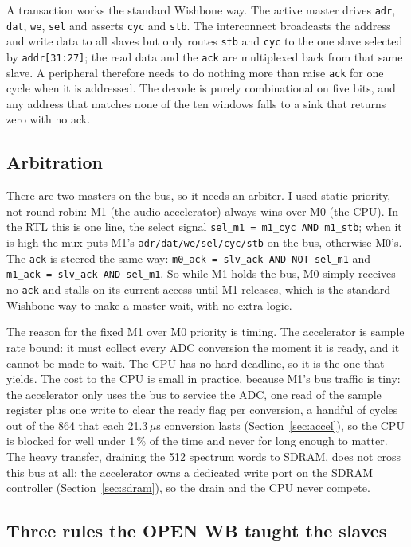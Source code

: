 \documentclass[a4paper,11pt]{article}
\begin{document}
A transaction works the standard Wishbone way. The active master drives
\texttt{adr}, \texttt{dat}, \texttt{we}, \texttt{sel} and asserts \texttt{cyc} and
\texttt{stb}. The interconnect broadcasts the address and write data to all slaves
but only routes \texttt{stb} and \texttt{cyc} to the one slave selected by
\texttt{addr[31:27]}; the read data and the \texttt{ack} are multiplexed back from
that same slave. A peripheral therefore needs to do nothing more than raise
\texttt{ack} for one cycle when it is addressed. The decode is purely combinational
on five bits, and any address that matches none of the ten windows falls to a sink
that returns zero with no ack.

\subsection{Arbitration}

There are two masters on the bus, so it needs an arbiter. I used static priority,
not round robin: M1 (the audio accelerator) always wins over M0 (the CPU). In the
RTL this is one line, the select signal \texttt{sel\_m1 = m1\_cyc AND m1\_stb}; when
it is high the mux puts M1's \texttt{adr/dat/we/sel/cyc/stb} on the bus, otherwise
M0's. The \texttt{ack} is steered the same way: \texttt{m0\_ack = slv\_ack AND NOT
sel\_m1} and \texttt{m1\_ack = slv\_ack AND sel\_m1}. So while M1 holds the bus, M0
simply receives no \texttt{ack} and stalls on its current access until M1 releases,
which is the standard Wishbone way to make a master wait, with no extra logic.

The reason for the fixed M1 over M0 priority is timing. The accelerator is sample
rate bound: it must collect every ADC conversion the moment it is ready, and it
cannot be made to wait. The CPU has no hard deadline, so it is the one that
yields. The cost to the CPU is small in practice, because M1's bus traffic is
tiny: the accelerator only uses the bus to service the ADC, one read of the
sample register plus one write to clear the ready flag per conversion, a handful
of cycles out of the 864 that each 21.3\,$\mu$s conversion lasts
(Section~\ref{sec:accel}), so the CPU is blocked for well under 1\,\% of the time
and never for long enough to matter. The heavy transfer, draining the 512
spectrum words to SDRAM, does not cross this bus at all: the accelerator owns a
dedicated write port on the SDRAM controller (Section~\ref{sec:sdram}), so the
drain and the CPU never compete.

\subsection{Three rules the OPEN WB taught the slaves}
\label{sec:wbrules}
\end{document}
